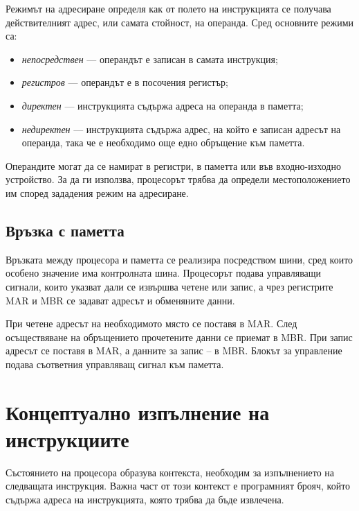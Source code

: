 \begin{defn}
Режимът на адресиране определя как от полето на инструкцията се получава действителният адрес, или самата стойност, на операнда. Сред основните режими са:

\begin{itemize}
\item \emph{непосредствен} --- операндът е записан в самата инструкция;
\item \emph{регистров} --- операндът е в посочения регистър;
\item \emph{директен} --- инструкцията съдържа адреса на операнда в паметта;
\item \emph{недиректен} --- инструкцията съдържа адрес, на който е записан адресът на операнда, така че е необходимо още едно обръщение към паметта.
\end{itemize}
\end{defn}

Операндите могат да се намират в регистри, в паметта или във входно-изходно устройство. За да ги използва, процесорът трябва да определи местоположението им според зададения режим на адресиране.

\subsection{Връзка с паметта}\label{s:9.3.5}

Връзката между процесора и паметта се реализира посредством шини, сред които особено значение има контролната шина. Процесорът подава управляващи сигнали, които указват дали се извършва четене или запис, а чрез регистрите MAR и MBR се задават адресът и обменяните данни.

При четене адресът на необходимото място се поставя в MAR. След осъществяване на обръщението прочетените данни се приемат в MBR. При запис адресът се поставя в MAR, а данните за запис -- в MBR. Блокът за управление подава съответния управляващ сигнал към паметта.

\section{Концептуално изпълнение на инструкциите}\label{s:9.4}

Състоянието на процесора образува контекста, необходим за изпълнението на следващата инструкция. Важна част от този контекст е програмният брояч, който съдържа адреса на инструкцията, която трябва да бъде извлечена.

